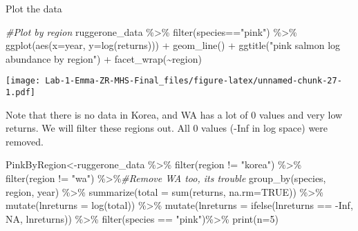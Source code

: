 \documentclass[
]{article}
\newenvironment{Shaded}{\begin{snugshade}}{\end{snugshade}}
\newcommand{\AttributeTok}[1]{\textcolor[rgb]{0.77,0.63,0.00}{#1}}
\newcommand{\CommentTok}[1]{\textcolor[rgb]{0.56,0.35,0.01}{\textit{#1}}}
\newcommand{\ConstantTok}[1]{\textcolor[rgb]{0.00,0.00,0.00}{#1}}
\newcommand{\DecValTok}[1]{\textcolor[rgb]{0.00,0.00,0.81}{#1}}
\newcommand{\FunctionTok}[1]{\textcolor[rgb]{0.00,0.00,0.00}{#1}}
\newcommand{\NormalTok}[1]{#1}
\newcommand{\OtherTok}[1]{\textcolor[rgb]{0.56,0.35,0.01}{#1}}
\newcommand{\SpecialCharTok}[1]{\textcolor[rgb]{0.00,0.00,0.00}{#1}}
\newcommand{\StringTok}[1]{\textcolor[rgb]{0.31,0.60,0.02}{#1}}
\begin{document}
Plot the data

\begin{Shaded}
\begin{Highlighting}[]
\CommentTok{\#Plot by region}
\NormalTok{ruggerone\_data }\SpecialCharTok{\%\textgreater{}\%} 
  \FunctionTok{filter}\NormalTok{(species}\SpecialCharTok{==}\StringTok{"pink"}\NormalTok{) }\SpecialCharTok{\%\textgreater{}\%} 
  \FunctionTok{ggplot}\NormalTok{(}\FunctionTok{aes}\NormalTok{(}\AttributeTok{x=}\NormalTok{year, }\AttributeTok{y=}\FunctionTok{log}\NormalTok{(returns))) }\SpecialCharTok{+} 
  \FunctionTok{geom\_line}\NormalTok{() }\SpecialCharTok{+} 
  \FunctionTok{ggtitle}\NormalTok{(}\StringTok{"pink salmon log abundance by region"}\NormalTok{) }\SpecialCharTok{+}
  \FunctionTok{facet\_wrap}\NormalTok{(}\SpecialCharTok{\textasciitilde{}}\NormalTok{region)}
\end{Highlighting}
\end{Shaded}

\texttt{[image: Lab-1-Emma-ZR-MHS-Final\_files/figure-latex/unnamed-chunk-27-1.pdf]}

Note that there is no data in Korea, and WA has a lot of 0 values and
very low returns. We will filter these regions out. All 0 values (-Inf
in log space) were removed.

\begin{Shaded}
\begin{Highlighting}[]
\NormalTok{PinkByRegion}\OtherTok{\textless{}{-}}\NormalTok{ruggerone\_data }\SpecialCharTok{\%\textgreater{}\%}
  \FunctionTok{filter}\NormalTok{(region }\SpecialCharTok{!=} \StringTok{"korea"}\NormalTok{) }\SpecialCharTok{\%\textgreater{}\%} 
  \FunctionTok{filter}\NormalTok{(region }\SpecialCharTok{!=} \StringTok{"wa"}\NormalTok{) }\SpecialCharTok{\%\textgreater{}\%}\CommentTok{\#Remove WA too, it\textquotesingle{}s trouble }
  \FunctionTok{group\_by}\NormalTok{(species, region, year) }\SpecialCharTok{\%\textgreater{}\%}
  \FunctionTok{summarize}\NormalTok{(}\AttributeTok{total =} \FunctionTok{sum}\NormalTok{(returns, }\AttributeTok{na.rm=}\ConstantTok{TRUE}\NormalTok{)) }\SpecialCharTok{\%\textgreater{}\%} 
  \FunctionTok{mutate}\NormalTok{(}\AttributeTok{lnreturns =} \FunctionTok{log}\NormalTok{(total)) }\SpecialCharTok{\%\textgreater{}\%}
  \FunctionTok{mutate}\NormalTok{(}\AttributeTok{lnreturns =} \FunctionTok{ifelse}\NormalTok{(lnreturns }\SpecialCharTok{==} \SpecialCharTok{{-}}\ConstantTok{Inf}\NormalTok{, }\ConstantTok{NA}\NormalTok{, lnreturns)) }\SpecialCharTok{\%\textgreater{}\%}
  \FunctionTok{filter}\NormalTok{(species }\SpecialCharTok{==} \StringTok{"pink"}\NormalTok{)}\SpecialCharTok{\%\textgreater{}\%} 
  \FunctionTok{print}\NormalTok{(}\AttributeTok{n=}\DecValTok{5}\NormalTok{)}
\end{Highlighting}
\end{Shaded}
\end{document}
